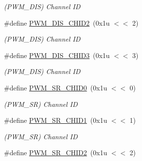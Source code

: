 \begin{DoxyCompactItemize}
\begin{DoxyCompactList}\small\item\em (P\+W\+M\+\_\+\+D\+IS) Channel ID \end{DoxyCompactList}\item 
\mbox{\label{group__SAMS70__PWM_ga74c86b68ac70aee9bb151eae80a19190}} 
\#define \mbox{\hyperlink{group__SAMS70__PWM_ga74c86b68ac70aee9bb151eae80a19190}{P\+W\+M\+\_\+\+D\+I\+S\+\_\+\+C\+H\+I\+D2}}~(0x1u $<$$<$ 2)
\begin{DoxyCompactList}\small\item\em (P\+W\+M\+\_\+\+D\+IS) Channel ID \end{DoxyCompactList}\item 
\mbox{\label{group__SAMS70__PWM_ga036f740d5b634027628c0f87918132d1}} 
\#define \mbox{\hyperlink{group__SAMS70__PWM_ga036f740d5b634027628c0f87918132d1}{P\+W\+M\+\_\+\+D\+I\+S\+\_\+\+C\+H\+I\+D3}}~(0x1u $<$$<$ 3)
\begin{DoxyCompactList}\small\item\em (P\+W\+M\+\_\+\+D\+IS) Channel ID \end{DoxyCompactList}\item 
\mbox{\label{group__SAMS70__PWM_ga8a0feb323f0888fcc4eb26f8475021e8}} 
\#define \mbox{\hyperlink{group__SAMS70__PWM_ga8a0feb323f0888fcc4eb26f8475021e8}{P\+W\+M\+\_\+\+S\+R\+\_\+\+C\+H\+I\+D0}}~(0x1u $<$$<$ 0)
\begin{DoxyCompactList}\small\item\em (P\+W\+M\+\_\+\+SR) Channel ID \end{DoxyCompactList}\item 
\mbox{\label{group__SAMS70__PWM_ga02d055995397c049308dbbbc862d2b3c}} 
\#define \mbox{\hyperlink{group__SAMS70__PWM_ga02d055995397c049308dbbbc862d2b3c}{P\+W\+M\+\_\+\+S\+R\+\_\+\+C\+H\+I\+D1}}~(0x1u $<$$<$ 1)
\begin{DoxyCompactList}\small\item\em (P\+W\+M\+\_\+\+SR) Channel ID \end{DoxyCompactList}\item 
\mbox{\label{group__SAMS70__PWM_gad0340aa3419df5dd39b9cd56c4b98862}} 
\#define \mbox{\hyperlink{group__SAMS70__PWM_gad0340aa3419df5dd39b9cd56c4b98862}{P\+W\+M\+\_\+\+S\+R\+\_\+\+C\+H\+I\+D2}}~(0x1u $<$$<$ 2)
$$
\end{DoxyCompactItemize}
